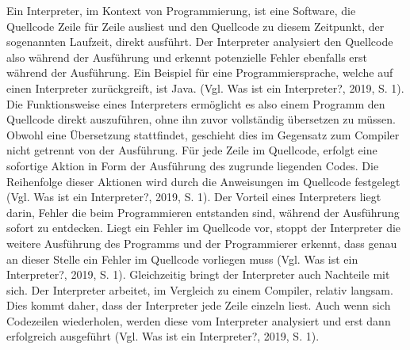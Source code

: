 Ein Interpreter, im Kontext von Programmierung, ist eine Software, die Quellcode Zeile für Zeile ausliest und den Quellcode zu diesem Zeitpunkt, der sogenannten Laufzeit, direkt ausführt. Der Interpreter analysiert den Quellcode also während der Ausführung und erkennt potenzielle Fehler ebenfalls erst während der Ausführung. Ein Beispiel für eine Programmiersprache, welche auf einen Interpreter zurückgreift, ist Java. (Vgl. Was ist ein Interpreter?, 2019, S. 1).
Die Funktionsweise eines Interpreters ermöglicht es also einem Programm den Quellcode direkt auszuführen, ohne ihn zuvor vollständig übersetzen zu müssen. Obwohl eine Übersetzung stattfindet, geschieht dies im Gegensatz zum Compiler nicht getrennt von der Ausführung. Für jede Zeile im Quellcode, erfolgt eine sofortige Aktion in Form der Ausführung des zugrunde liegenden Codes. Die Reihenfolge dieser Aktionen wird durch die Anweisungen im Quellcode festgelegt (Vgl. Was ist ein Interpreter?, 2019, S. 1).
Der Vorteil eines Interpreters liegt darin, Fehler die beim Programmieren entstanden sind, während der Ausführung sofort zu entdecken. Liegt ein Fehler im Quellcode vor, stoppt der Interpreter die weitere Ausführung des Programms und der Programmierer erkennt, dass genau an dieser Stelle ein Fehler im Quellcode vorliegen muss (Vgl. Was ist ein Interpreter?, 2019, S. 1).
Gleichzeitig bringt der Interpreter auch Nachteile mit sich. Der Interpreter arbeitet, im Vergleich zu einem Compiler, relativ langsam. Dies kommt daher, dass der Interpreter jede Zeile einzeln liest. Auch wenn sich Codezeilen wiederholen, werden diese vom Interpreter analysiert und erst dann erfolgreich ausgeführt (Vgl. Was ist ein Interpreter?, 2019, S. 1).
